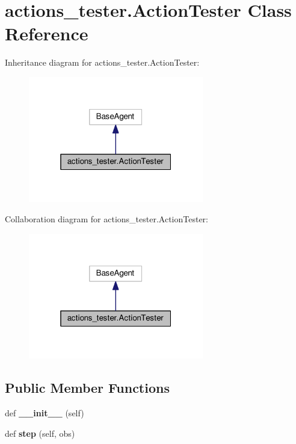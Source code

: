 \hypertarget{classactions__tester_1_1ActionTester}{}\section{actions\+\_\+tester.\+Action\+Tester Class Reference}
\label{classactions__tester_1_1ActionTester}


Inheritance diagram for actions\+\_\+tester.\+Action\+Tester\+:
\nopagebreak
\begin{figure}[H]
\begin{center}
\leavevmode
\includegraphics[width=217pt]{classactions__tester_1_1ActionTester__inherit__graph}
\end{center}
\end{figure}


Collaboration diagram for actions\+\_\+tester.\+Action\+Tester\+:
\nopagebreak
\begin{figure}[H]
\begin{center}
\leavevmode
\includegraphics[width=217pt]{classactions__tester_1_1ActionTester__coll__graph}
\end{center}
\end{figure}
\subsection*{Public Member Functions}
\begin{DoxyCompactItemize}
\item 
def {\bfseries \+\_\+\+\_\+init\+\_\+\+\_\+} (self)\hypertarget{classactions__tester_1_1ActionTester_a4a120ce4023e1a7ca13cc46611cec779}{}\label{classactions__tester_1_1ActionTester_a4a120ce4023e1a7ca13cc46611cec779}

\item 
def {\bfseries step} (self, obs)\hypertarget{classactions__tester_1_1ActionTester_ad2461d03ad6727b2526bf524de3c4978}{}\label{classactions__tester_1_1ActionTester_ad2461d03ad6727b2526bf524de3c4978}

\end{DoxyCompactItemize}


